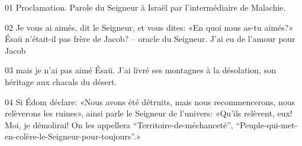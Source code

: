 01 Proclamation. Parole du Seigneur à Israël par l’intermédiaire de Malachie.

02 Je vous ai aimés, dit le Seigneur, et vous dites: «En quoi nous as-tu aimés?» Ésaü n’était-il pas frère de Jacob? – oracle du Seigneur. J’ai eu de l’amour pour Jacob

03 mais je n’ai pas aimé Ésaü. J’ai livré ses montagnes à la désolation, son héritage aux chacals du désert.

04 Si Édom déclare: «Nous avons été détruits, mais nous recommencerons, nous relèverons les ruines», ainsi parle le Seigneur de l’univers: «Qu’ils relèvent, eux! Moi, je démolirai! On les appellera “Territoire-de-méchanceté”, “Peuple-qui-met-en-colère-le-Seigneur-pour-toujours”.»
